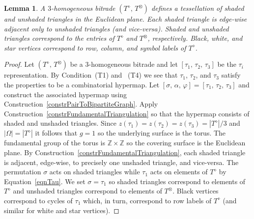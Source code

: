 \documentclass[amstags,fleqn,reqno]{article}
\theoremstyle{plain}
\newtheorem{lemma}[theorem]{Lemma}
\theoremstyle{definition}
\newcommand{\Tidentity}{\textnormal{(T1)}\xspace}
\newcommand{\Ttransitive}{\textnormal{(T4)}\xspace}
\newcommand{\opa}{\diamond}
\newcommand{\opb}{\otimes}
\begin{document}
\begin{lemma}\label{lemmaTorus}
A $3$-homogeneous bitrade $(T^{\opa},\, T^{\opb})$ defines a
tessellation of shaded and unshaded triangles in the Euclidean plane.
Each shaded triangle is edge-wise adjacent only to unshaded triangles
(and vice-versa). Shaded and unshaded triangles correspond to
the entries of $T^{\opa}$ and $T^{\opb}$, respectively. Black, white,
and star vertices correspond to row, column, and symbol labels of
$T^{\opa}$.
\end{lemma}

\begin{proof}
Let $(T^{\opa},\, T^{\opb})$ be a $3$-homogeneous bitrade
and let $[\tau_1,\, \tau_2,\, \tau_3]$ be the $\tau_i$ representation.
By Condition~\Tidentity and ~\Ttransitive we see that
$\tau_1$, $\tau_2$, and $\tau_3$ satisfy the properties to be a
combinatorial hypermap.
Let $[\sigma,\, \alpha,\, \varphi] = [\tau_1,\, \tau_2,\, \tau_3]$ and
construct the associated hypermap using
Construction~\ref{constrPairToBipartiteGraph}.
Apply Construction~\ref{constrFundamentalTriangulation} so that the
hypermap consists of shaded and unshaded triangles.  
Since $z(\tau_1) = z(\tau_2) = z(\tau_3) = \left| T^{\opa} \right|/3$
and $\left| \Omega  \right| = \left| T^{\opa} \right|$ it follows that
$g=1$ so the underlying surface is the torus.
The fundamental group of the torus is 
$\mathbb{Z} \times \mathbb{Z}$ so the covering surface
is the Euclidean plane.
By Construction~\ref{constrFundamentalTriangulation},
each shaded triangle is adjacent, edge-wise, to precisely one unshaded
triangle, and vice-versa. The permutation $\sigma$ acts on
shaded triangles while $\tau_1$ acts on elements of $T^{\opa}$
by Equation~\eqref{eqnTau}. We set $\sigma = \tau_1$ so
shaded triangles correspond to elements of $T^{\opa}$
and unshaded triangles correspond to elements of $T^{\opb}$.
Black vertices correspond to cycles of $\tau_1$ which, in turn, correspond
to row labels of $T^{\opa}$ (and similar for white and star vertices).
\end{proof}
\end{document}
